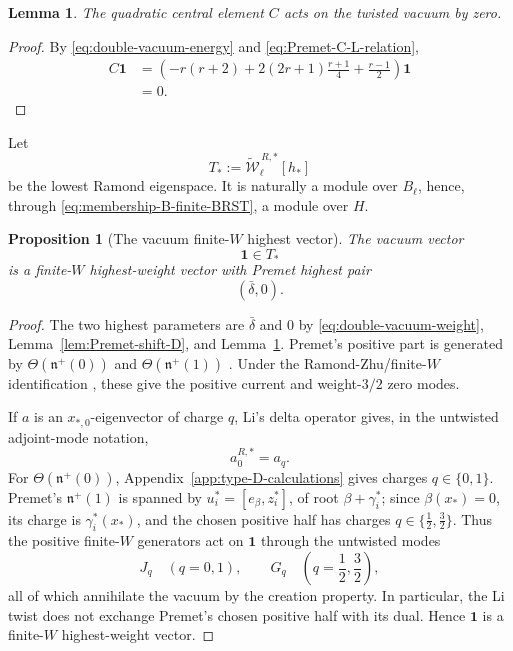 \documentclass[11pt]{amsart}
\newtheorem{proposition}[theorem]{Proposition}
\newtheorem{lemma}[theorem]{Lemma}
\theoremstyle{remark}
\numberwithin{equation}{section}
\begin{document}
\begin{lemma}
\label{lem:vacuum-C-zero}
The quadratic central element \(C\) acts on the twisted vacuum by zero.
\end{lemma}

\begin{proof}
By \eqref{eq:double-vacuum-energy} and
\eqref{eq:Premet-C-L-relation},
\[
\begin{aligned}
   C\mathbf1
   &=
   \left(
      -r(r+2)
      +2(2r+1)\frac{r+1}{4}
      +\frac{r-1}{2}
   \right)\mathbf1\\
   &=0.
\end{aligned}
\]
\end{proof}

Let
\[
   T_*:=
   \widetilde{\mathcal W}_\ell^{\,R,*}[h_*]
\]
be the lowest Ramond eigenspace.  It is naturally a module over
\(B_\ell\), hence, through \eqref{eq:membership-B-finite-BRST}, a module
over \(H\).

\begin{proposition}[The vacuum finite-\(W\) highest vector]
\label{prop:vacuum-finite-W-highest}
The vacuum vector
\[
   \mathbf1\in T_*
\]
is a finite-\(W\) highest-weight vector with Premet highest pair
\begin{equation}
   (\bar\delta,0).
\end{equation}
\end{proposition}

\begin{proof}
The two highest parameters are \(\bar\delta\) and \(0\) by
\eqref{eq:double-vacuum-weight}, Lemma~\ref{lem:Premet-shift-D}, and
Lemma~\ref{lem:vacuum-C-zero}.  Premet's positive part is generated by
\(\Theta(\mathfrak n^+(0))\) and \(\Theta(\mathfrak n^+(1))\)
\cite[Section~7]{Premet2007}.  Under the Ramond-Zhu/finite-\(W\)
identification \cite[Subsection~2.3]{Jin2026}, these give the positive
current and weight-\(3/2\) zero modes.

If \(a\) is an \(x_{*,0}\)-eigenvector of charge \(q\), Li's delta
operator gives, in the untwisted adjoint-mode notation,
\begin{equation}
\label{eq:Li-zero-mode-shift}
   a^{R,*}_0=a_q.
\end{equation}
For \(\Theta(\mathfrak n^+(0))\), Appendix~\ref{app:type-D-calculations}
gives charges \(q\in\{0,1\}\).  Premet's \(\mathfrak n^+(1)\) is spanned by
\(u_i^*=[e_\beta,z_i^*]\), of root \(\beta+\gamma_i^*\); since
\(\beta(x_*)=0\), its charge is \(\gamma_i^*(x_*)\), and the chosen positive
half has charges \(q\in\{\frac12,\frac32\}\).  Thus the positive finite-\(W\)
generators act on \(\mathbf1\) through the untwisted modes
\[
   J_q\quad(q=0,1),
   \qquad
   G_q\quad\left(q=\frac12,\frac32\right),
\]
all of which annihilate the vacuum by the creation property.  In particular,
the Li twist does not exchange Premet's chosen positive half with its dual.
Hence \(\mathbf1\) is a finite-\(W\) highest-weight vector.
\end{proof}
\end{document}
